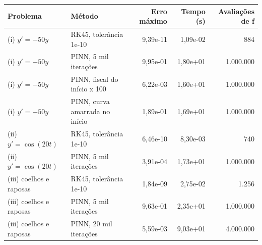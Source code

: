 \begin{tabular}{llrrr}
\hline
Problema & Método & Erro máximo & Tempo (s) & Avaliações de f \\
\hline
(i) $y' = -50y$ & RK45, tolerância 1e-10 & 9,39e-11 & 1,09e-02 & 884 \\
(i) $y' = -50y$ & PINN, 5 mil iterações & 9,95e-01 & 1,80e+01 & 1.000.000 \\
(i) $y' = -50y$ & PINN, fiscal do início x 100 & 6,22e-03 & 1,60e+01 & 1.000.000 \\
(i) $y' = -50y$ & PINN, curva amarrada no início & 1,89e-01 & 1,69e+01 & 1.000.000 \\
(ii) $y' = \cos(20t)$ & RK45, tolerância 1e-10 & 6,46e-10 & 8,30e-03 & 740 \\
(ii) $y' = \cos(20t)$ & PINN, 5 mil iterações & 3,91e-04 & 1,73e+01 & 1.000.000 \\
(iii) coelhos e raposas & RK45, tolerância 1e-10 & 1,84e-09 & 2,75e-02 & 1.256 \\
(iii) coelhos e raposas & PINN, 5 mil iterações & 9,63e-01 & 2,35e+01 & 1.000.000 \\
(iii) coelhos e raposas & PINN, 20 mil iterações & 5,59e-03 & 9,03e+01 & 4.000.000 \\
\hline
\end{tabular}
